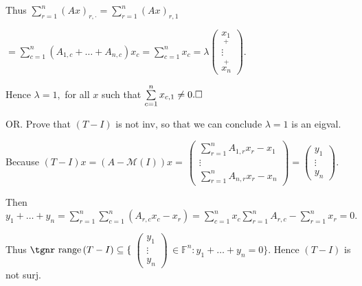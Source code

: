 \documentclass[a4paper, 11pt, UTF8]{article}
\def\range{{\textup{\tgnr range}}\,}
\def\Mt{\mathcal{M}}
\def\Fbb{{\mathbb{F}}}
\def\Hb{{\large\Blind{(b) }}}
\def\Or{{\large O{\footnotesize R.} }}
\begin{document}
\begin{large}
Thus $\sum\limits_{r=1}^n (Ax)_{r,\cdot}=\sum\limits_{r=1}^n (Ax)_{r,1}$\par\qquad\qquad\qquad\qquad\quad
$=\sum\limits_{c=1}^n(A_{1,c}+\dots+A_{n,c})x_c=\sum\limits_{c=1}^n x_c=\lambda${\small$\begin{pmatrix}
\underset{+}{x_1}\\ \vdots\\ \overset{+}{x_n}
\end{pmatrix}.$}\par\quad\Hb
Hence $\lambda=1,$ for all $x$ such that $\sum\limits_{c=1}^n x_{c,1}\neq 0.\hfill\square$\par\vspace{6pt}\quad\Hb
\Or Prove that $(T-I)$ is not inv, so that we can conclude $\lambda=1$ is an eigval.\par\quad\Hb
Because $(T-I)x=\left(A-\Mt(I)\right)x=\,${\small$\begin{pmatrix} \sum\limits_{r=1}^n A_{1,r}x_r-x_1\\ \vdots\\ \sum\limits_{r=1}^n A_{n,r}x_r-x_n\end{pmatrix}=\begin{pmatrix} y_1\\ \vdots\\ y_n\end{pmatrix}.$}\par\quad\Hb
Then $y_1+\dots+y_n=\sum\limits_{r=1}^n\sum\limits_{c=1}^n (A_{r,c}x_c-x_r)=\sum\limits_{c=1}^n x_c\sum\limits_{r=1}^n A_{r,c}-\sum\limits_{r=1}^n x_r=0.$\par\vspace{6pt}\quad\Hb
Thus $\range(T-I)\subseteq\{\,${\small$\begin{pmatrix}
y_1 \\ \vdots \\ y_n\end{pmatrix}$}$\,\in\Fbb^n:y_1+\dots+y_n=0\}.$ Hence $(T-I)$ is not surj.\PfEnd
\SepLine\par


\end{large}
\end{document}
